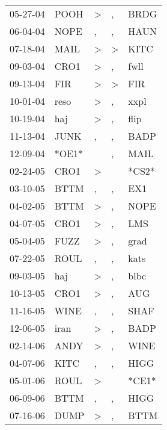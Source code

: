 \begin{supertabular}{lllll}
 05-27-04 &   POOH &     \textgreater &                , &   BRDG \\
 06-04-04 &   NOPE &                , &                , &   HAUN \\
 07-18-04 &   MAIL &     \textgreater &     \textgreater &   KITC \\
 09-03-04 &   CRO1 &     \textgreater &                , &   fwll \\
 09-13-04 &    FIR &     \textgreater &     \textgreater &    FIR \\
 10-01-04 &   reso &     \textgreater &                , &   xxpl \\
 10-19-04 &    haj &     \textgreater &                , &   flip \\
 11-13-04 &   JUNK &                , &                , &   BADP \\
 12-09-04 &  *OE1* &                  &                , &   MAIL \\
 02-24-05 &   CRO1 &     \textgreater &                  &  *CS2* \\
 03-10-05 &   BTTM &                , &                , &    EX1 \\
 04-02-05 &   BTTM &     \textgreater &                , &   NOPE \\
 04-07-05 &   CRO1 &     \textgreater &                , &    LMS \\
 05-04-05 &   FUZZ &     \textgreater &                , &   grad \\
 07-22-05 &   ROUL &                , &                , &   kats \\
 09-03-05 &    haj &     \textgreater &                , &   blbc \\
 10-13-05 &   CRO1 &     \textgreater &                , &    AUG \\
 11-16-05 &   WINE &                , &                , &   SHAF \\
 12-06-05 &   iran &     \textgreater &                , &   BADP \\
 02-14-06 &   ANDY &     \textgreater &                , &   WINE \\
 04-07-06 &   KITC &                , &                , &   HIGG \\
 05-01-06 &   ROUL &     \textgreater &                  &  *CE1* \\
 06-09-06 &   BTTM &                , &                , &   HIGG \\
 07-16-06 &   DUMP &     \textgreater &                , &   BTTM \\

\end{supertabular}
